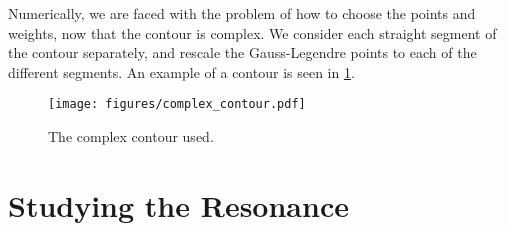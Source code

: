 Numerically, we are faced with the problem of how to choose 
the points and weights, now that the contour is complex. 
We consider each straight segment of the contour separately, 
and rescale the Gauss-Legendre points to each of the different segments.
An example of a contour is seen in 
\cref{fig:triangle contour}.

\begin{figure}[H]
  \centering
    \texttt{[image: figures/complex\_contour.pdf]}
  \caption{The complex contour used.}
  \label{fig:triangle contour}
\end{figure}

\section{Studying the Resonance}

